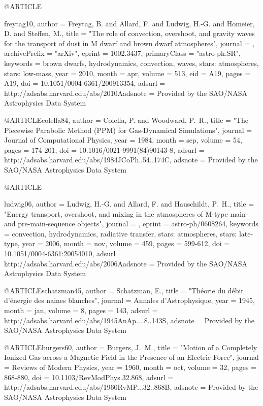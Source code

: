 \documentclass[a4paper,fleqn,usenatbib]{mnras}
\begin{document}
{@ARTICLE{freytag10,
   author = {{Freytag}, B. and {Allard}, F. and {Ludwig}, H.-G. and {Homeier}, D. and 
	{Steffen}, M.},
    title = "{The role of convection, overshoot, and gravity waves for the transport of dust in M dwarf and brown dwarf atmospheres}",
  journal = {\aap},
archivePrefix = "arXiv",
   eprint = {1002.3437},
 primaryClass = "astro-ph.SR",
 keywords = {brown dwarfs, hydrodynamics, convection, waves, stars: atmospheres, stars: low-mass},
     year = 2010,
    month = apr,
   volume = 513,
      eid = {A19},
    pages = {A19},
      doi = {10.1051/0004-6361/200913354},
   adsurl = {http://adsabs.harvard.edu/abs/2010Aadsnote = {Provided by the SAO/NASA Astrophysics Data System}
}

@ARTICLE{colella84,
   author = {{Colella}, P. and {Woodward}, P.~R.},
    title = "{The Piecewise Parabolic Method (PPM) for Gas-Dynamical Simulations}",
  journal = {Journal of Computational Physics},
     year = 1984,
    month = sep,
   volume = 54,
    pages = {174-201},
      doi = {10.1016/0021-9991(84)90143-8},
   adsurl = {http://adsabs.harvard.edu/abs/1984JCoPh..54..174C},
  adsnote = {Provided by the SAO/NASA Astrophysics Data System}
}



@ARTICLE{ludwig06,
   author = {{Ludwig}, H.-G. and {Allard}, F. and {Hauschildt}, P.~H.},
    title = "{Energy transport, overshoot, and mixing in the atmospheres of M-type main- and pre-main-sequence objects}",
  journal = {\aap},
   eprint = {astro-ph/0608264},
 keywords = {convection, hydrodynamics, radiative transfer, stars: atmospheres, stars: late-type},
     year = 2006,
    month = nov,
   volume = 459,
    pages = {599-612},
      doi = {10.1051/0004-6361:20054010},
   adsurl = {http://adsabs.harvard.edu/abs/2006Aadsnote = {Provided by the SAO/NASA Astrophysics Data System}
}



@ARTICLE{schatzman45,
   author = {{Schatzman}, E.},
    title = "{Th{\'e}orie du d{\'e}bit d'{\'e}nergie des naines blanches}",
  journal = {Annales d'Astrophysique},
     year = 1945,
    month = jan,
   volume = 8,
    pages = {143},
   adsurl = {http://adsabs.harvard.edu/abs/1945AnAp....8..143S},
  adsnote = {Provided by the SAO/NASA Astrophysics Data System}
}

@ARTICLE{burgers60,
   author = {{Burgers}, J.~M.},
    title = "{Motion of a Completely Ionized Gas across a Magnetic Field in the Presence of an Electric Force}",
  journal = {Reviews of Modern Physics},
     year = 1960,
    month = oct,
   volume = 32,
    pages = {868-880},
      doi = {10.1103/RevModPhys.32.868},
   adsurl = {http://adsabs.harvard.edu/abs/1960RvMP...32..868B},
  adsnote = {Provided by the SAO/NASA Astrophysics Data System}
}

}}}
\end{document}

